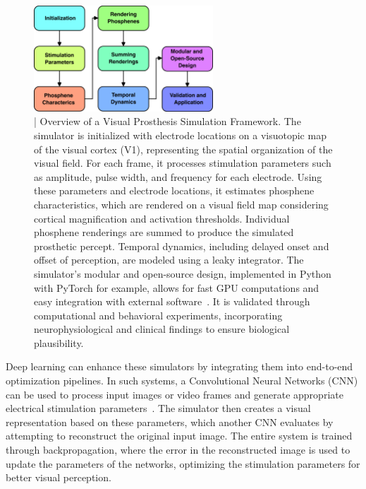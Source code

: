 \documentclass[10pt]{article}
\begin{document}
\begin{figure}[ht!]
  \centering
  \includegraphics[width=0.6\textwidth]{imgs/block_diagram_vis_prost.png}
  \caption{| Overview of a Visual Prosthesis Simulation Framework. The
    simulator is initialized with electrode locations on a visuotopic
    map of the visual cortex (V1), representing the spatial organization
    of the visual field. For each frame, it processes stimulation
    parameters such as amplitude, pulse width, and frequency for each
    electrode. Using these parameters and electrode locations, it
    estimates phosphene characteristics, which are rendered on a visual
    field map considering cortical magnification and activation
    thresholds. Individual phosphene renderings are summed to produce
    the simulated prosthetic percept. Temporal dynamics, including
    delayed onset and offset of perception, are modeled using a leaky
    integrator. The simulator's modular and open-source design,
    implemented in Python with PyTorch for example, allows for fast GPU
    computations and easy integration with external
    software~\parencite{deruytervansteveninckEndtoendOptimizationProsthetic2022}.
    It is validated through computational and behavioral experiments,
    incorporating neurophysiological and clinical findings to ensure
    biological plausibility.}\label{fig:simulator_framework}
\end{figure}

Deep learning can enhance these simulators by integrating them into end-to-end
optimization pipelines. In such systems, a Convolutional Neural Networks (CNN)
can be used to process input images or video frames and generate appropriate
electrical stimulation
parameters~\parencite{wangNeuroSEENeuromorphicEnergyEfficient2022}. The
simulator then creates a visual representation based on these parameters, which
another CNN evaluates by attempting to reconstruct the original input image. The
entire system is trained through backpropagation, where the error in the
reconstructed image is used to update the parameters of the networks, optimizing
the stimulation parameters for better visual perception.
\end{document}
